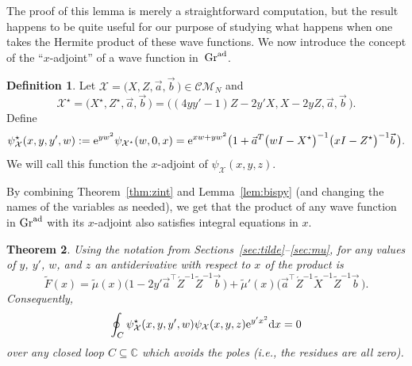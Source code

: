 \documentclass[10pt,a4paper]{amsart}
\numberwithin{equation}{section}
\newtheorem{Theorem}{Theorem}[section]
\theoremstyle{definition}
\newtheorem{Definition}[Theorem]{Definition}
\def\psistar{\psi^{\star}}
\def\X{\mathcal{X}}
\def\CM{\mathcal{C\!M}}
\def\C{\mathbb{C}}
\begin{document}
The proof of this lemma is merely a straightforward computation, but
 the result happens to be quite useful for our purpose of studying what
 happens when one takes the Hermite product of these wave functions.
 We now introduce the concept of the ``$x$-adjoint'' of a wave function
 in~${\rm Gr}^{\rm ad}$.

\begin{Definition}\label{def:star}
Let $\X=\bigl(X,Z,\vec a,\vec b\,\bigr)\in\CM_N$
and \[\X^{\star}=\bigl(X^\star,Z^{\star},\vec a,\vec b\,\bigr)=
\bigl((4yy'-1)Z-2y'X,X-2yZ,\vec a,\vec b\,\bigr).
\]
Define
\[
\psistar_{\X}(x,y,y',w):={\rm e}^{yw^2}\psi_{\X^{\star}}(w,0,x)={\rm e}^{xw+yw^2}\bigl(1+\vec
a^T\bigl(wI-X^\star\bigr)^{-1}\bigl(xI-Z^\star\bigr)^{-1}\vec b\,\bigr).
\]
We will call this function the $x$-adjoint of $\psi_{\X}(x,y,z)$.
\end{Definition}

By combining Theorem~\ref{thm:zint} and Lemma~\ref{lem:bispy} (and
changing the names of the variables as needed), we get that the
product of any wave
function in ${\rm Gr}^{\rm ad}$ with its $x$-adjoint also satisfies integral equations in $x$.

\begin{Theorem}\label{thm:xint}
Using the notation from Sections~{\rm\ref{sec:tilde}}--{\rm\ref{sec:mu}}, for any values of $y$, $y'$, $w$, and $z$ an antiderivative with
respect to $x$ of the product
\smash{$
\psistar_{\X}(x,y,y',w)\psi_{\X}(x,y,z){\rm e}^{y'x^2}
$}
is
\begin{equation}\label{eqn:ADinx}
\tilde F(x)=\tilde\mu(x)\bigl(1-2y'\vec a^{\top}\acute Z^{-1}\tilde Z^{-1}\vec
b\,\bigr)+\tilde\mu'(x)\bigl(\vec a^{\top}\acute Z^{-1}
\tilde X^{-1}\tilde Z^{-1}\vec b\,\bigr).
\end{equation}
Consequently,
\[
\oint_C\psistar_{\X}(x,y,y',w) \psi_{\X}(x,y,z){\rm e}^{y'x^2}{\rm d}x=0
\]
over any closed loop $C\subseteq\C$ which avoids the poles {\rm(}i.e., the
residues are all zero{\rm)}.
\end{Theorem}
\end{document}
